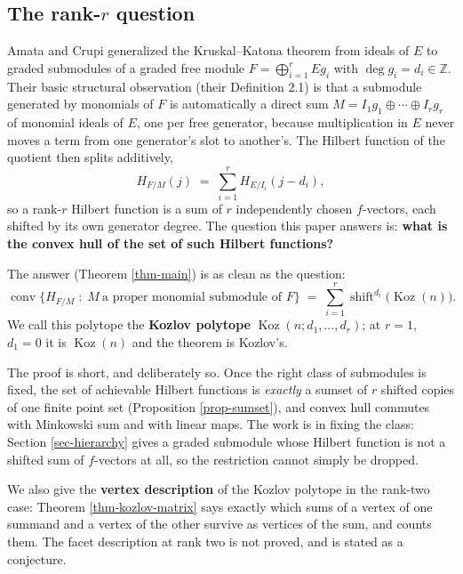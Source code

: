 \documentclass[11pt, a4paper, abstract=yes]{scrartcl}
\theoremstyle{definition}
\theoremstyle{remark}
\theoremstyle{plain}
\newcommand{\Koz}{\operatorname{Koz}}
\newcommand{\shift}{\operatorname{shift}}
\newcommand{\conv}{\operatorname{conv}}
\begin{document}
\subsection{The rank-\(r\) question}
\label{sec:orgc592a50}

Amata and Crupi \autocite{AmataCrupi2020,AmataCrupi2020KK} generalized the Kruskal--Katona theorem from ideals of \(E\) to graded
submodules of a graded free module \(F=\bigoplus_{i=1}^rEg_i\) with \(\deg g_i=d_i\in\mathbb Z\).
Their basic structural observation (their Definition 2.1) is that a submodule generated by monomials
of \(F\) is automatically a direct sum \(M=I_1g_1\oplus\cdots\oplus I_rg_r\) of monomial ideals of
\(E\), one per free generator, because multiplication in \(E\) never moves a term from one
generator's slot to another's. The Hilbert function of the quotient then splits additively,
\begin{equation}\label{eq:eq-3}
  H_{F/M}(j)\;=\;\sum_{i=1}^{r}H_{E/I_i}(j-d_i),
\end{equation}
so a rank-\(r\) Hilbert function is a sum of \(r\) independently chosen \(f\)-vectors, each shifted
by its own generator degree. The question this paper answers is: \textbf{what is the convex hull of the set
of such Hilbert functions?}

The answer (Theorem \ref{thm-main}) is as clean as the question:
\begin{equation}\label{eq:eq-4}
  \conv\bigl\lbrace H_{F/M}\;:\;M\ \text{a proper monomial submodule of }F\bigr\rbrace
  \;=\;\sum_{i=1}^{r}\shift^{d_i}\bigl(\Koz(n)\bigr).
\end{equation}
We call this polytope the \textbf{Kozlov polytope} \(\Koz(n;d_1,\dots,d_r)\); at \(r=1\), \(d_1=0\) it is
\(\Koz(n)\) and the theorem is Kozlov's.

The proof is short, and deliberately so. Once the right class of submodules is fixed, the set of
achievable Hilbert functions is \emph{exactly} a sumset of \(r\) shifted copies of one finite point set
(Proposition \ref{prop-sumset}), and convex hull commutes with Minkowski sum and with linear maps. The
work is in fixing the class: Section \ref{sec-hierarchy} gives a graded submodule whose Hilbert
function is not a shifted sum of \(f\)-vectors at all, so the restriction cannot simply be dropped.

We also give the \textbf{vertex description} of the Kozlov polytope in the rank-two case: Theorem
\ref{thm-kozlov-matrix} says exactly which sums of a vertex of one summand and a vertex of the other
survive as vertices of the sum, and counts them. The facet description at rank two is not proved,
and is stated as a conjecture.
\end{document}
